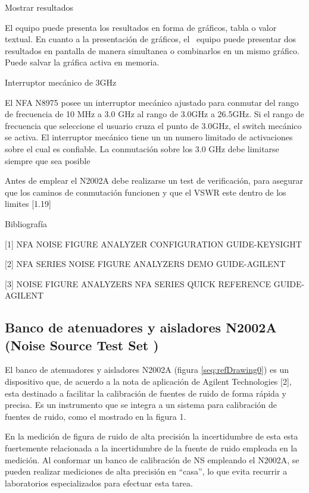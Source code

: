 \documentclass[paper=letter,oneside,fontsize=10pt,parskip=full]{article}
\newcounter{Drawing}
\begin{document}
Mostrar resultados

El equipo puede presenta los resultados en forma de gráficos, tabla o valor textual. En cuanto a la presentación de
gráficos, el \ equipo puede presentar dos resultados en pantalla de manera simultanea o combinarlos en un mismo
gráfico. Puede salvar la gráfica activa en memoria.

Interruptor mecánico de 3GHz

El NFA N8975 posee un interruptor mecánico ajustado para conmutar del rango de frecuencia de 10 MHz a 3.0 GHz al rango
de 3.0GHz a 26.5GHz. Si el rango de frecuencia que seleccione el usuario cruza el punto de 3.0GHz, el switch mecánico
se activa. El interruptor mecánico tiene un un numero limitado de activaciones sobre el cual es confiable. La
conmutación sobre los 3.0 GHz debe limitarse siempre que sea posible

Antes de emplear el N2002A debe realizarse un test de verificación, para asegurar que los caminos de conmutación
funcionen y que el VSWR este dentro de los limites [1.19]

Bibliografía

[1] NFA NOISE FIGURE ANALYZER CONFIGURATION GUIDE-KEYSIGHT

[2] NFA SERIES NOISE FIGURE ANALYZERS DEMO GUIDE-AGILENT

[3] NOISE FIGURE ANALYZERS NFA SERIES QUICK REFERENCE GUIDE-AGILENT

\subsection[Banco de atenuadores y aisladores N2002A (Noise Source Test Set )]{Banco de atenuadores y aisladores N2002A
(Noise Source Test Set )}
El banco de atenuadores y aisladores N2002A (figura \ref{seq:refDrawing0}) es un dispositivo que, de acuerdo a la nota
de aplicación de Agilent Technologies [2], esta destinado a facilitar la calibración de fuentes de ruido de forma
rápida y precisa. Es un instrumento que se integra a un sistema para calibración de fuentes de ruido, como el mostrado
en la figura 1. 

En la medición de figura de ruido de alta precisión la incertidumbre de esta esta fuertemente relacionada a la
incertidumbre de la fuente de ruido empleada en la medición. Al conformar un banco de calibración de NS empleando el
N2002A, se pueden realizar mediciones de alta precisión en “casa”, lo que evita recurrir a laboratorios especializados
para efectuar esta tarea.
\end{document}

